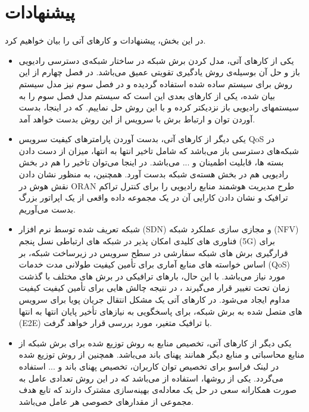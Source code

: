  \section{پیشنهادات}
 در این بخش، پیشنهادات و کارهای آتی را بیان خواهیم کرد.
 \begin{itemize}
\item
 یکی از کارهای آتی، مدل کردن برش شبکه در ساختار شبکه‌ی دسترسی رادیویی باز و حل آن بوسیله‌ی روش یادگیری تقویتی عمیق می‌باشد. در فصل چهارم از این روش برای سیستم ساده شده استفاده گردیده و در فصل سوم نیز مدل سیستم بیان شده، یکی از کارهای بعدی این است که سیستم مدل فصل سوم را به سیستمهای رادیویی باز نزدیکتر کرده و
با این روش حل نماییم. که در اینجا، بدست آوردن توان و ارتباط برش با سرویس از این روش بدست خواهد آمد.
\item 
یکی دیگر از کارهای آتی، بدست آوردن پارامترهای کیفیت سرویس QoS
در شبکه‌های دسترسی باز می‌باشد که شامل تاخیر انتها به انتها، میزان از دست دادن بسته ها،
قابلیت اطمینان و ... می‌باشد.
در اینجا می‌توان تاخیر را هم در بخش رادیویی هم در بخش هسته‌ی شبکه بدست آورد. 
همچنین،
به منظور نشان دادن نقش هوش در ORAN طرح مدیریت هوشمند منابع رادیویی را برای کنترل تراکم ترافیک و نشان دادن کارایی آن در یک مجموعه داده واقعی از یک اپراتور بزرگ بدست می‌آوریم.
\item 
شبکه تعریف شده توسط نرم افزار (SDN) و مجازی سازی عملکرد شبکه (NFV) فناوری های کلیدی امکان پذیر در شبکه های ارتباطی نسل پنجم (5G) برای قرارگیری برش های شبکه سفارشی در سطح سرویس در زیرساخت شبکه، بر اساس خواسته های منابع آماری برای تأمین کیفیت طولانی مدت خدمات (QoS) مورد نیاز می‌باشد. با این حال، بارهای ترافیکی در برش های مختلف با گذشت زمان تحت تغییر قرار می‌گیرند ، در نتیجه چالش هایی برای تأمین کیفیت کیفیت مداوم ایجاد می‌شود.
در کارهای آتی یک مشکل انتقال جریان پویا برای سرویس های متصل شده به برش شبکه، برای پاسخگویی به نیازهای تأخیر پایان انتها به انتها (E2E) با ترافیک متغیر، مورد بررسی قرار خواهد گرفت.
\item
یکی دیگر از کارهای آتی، تخصیص منابع به روش توزیع شده برای برش شبکه از منابع محاسباتی و منابع دیگر همانند پهنای باند می‌باشد.
همچنین از روش توزیع شده در لینک فراسو  
برای تخصیص توان کاربران، تخصیص پهنای باند و ... استفاده می‌گردد. یکی از روشها، استفاده از 
می‌باشد که در این روش تعدادی عامل به صورت همکارانه سعی در حل یک معادله‌ی بهینه‌سازی مشترک دارند که تابع هدف مجموعی از مقدارهای خصوصی هر عامل ‌می‌باشد. 
 \end{itemize}
 
  